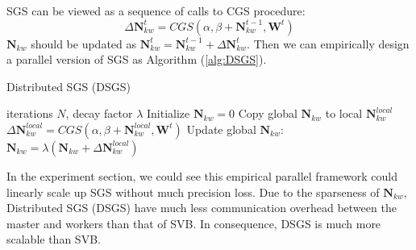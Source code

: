 \documentclass{article}
\begin{document}
SGS can be viewed as a sequence of calls to CGS procedure: 
$$\Delta \bm{N}_{kw}^t=CGS(\alpha, \beta +\bm{N}_{kw}^{t-1}, \bm{W}^t)$$
$\bm{N}_{kw}$ should be updated as $\bm{N}_{kw}^t=\bm{N}_{kw}^{t-1}+\Delta \bm{N}_{kw}^t$. Then we can empirically design a parallel version of SGS as Algorithm (\ref{alg:DSGS}).

\begin{algorithm}[tb]
   \caption{Distributed SGS (DSGS)}
   \label{alg:DSGS}
\begin{algorithmic}
    iterations $N$, decay factor $\lambda$
   \STATE Initialize $\bm{N}_{kw}=0$
   		\STATE Copy global $\bm{N}_{kw}$ to local $\bm{N}_{kw}^{local}$
   		\STATE $\Delta \bm{N}_{kw}^{local}=CGS(\alpha, \beta+\bm{N}_{kw}^{local}, \bm{W}^t)$
   		\STATE Update global $\bm{N}_{kw}$: $\bm{N}_{kw}=\lambda (\bm{N}_{kw} + \Delta \bm{N}_{kw}^{local})$
   \ENDFOR   
\end{algorithmic}
\end{algorithm}

In the experiment section, we could see this empirical parallel framework could linearly scale up SGS without much precision loss. Due to the sparseness of $\bm{N}_{kw}$, Distributed SGS (DSGS) have much less communication overhead between the master and workers than that of SVB. In consequence, DSGS is much more scalable than SVB. 

\end{document}
